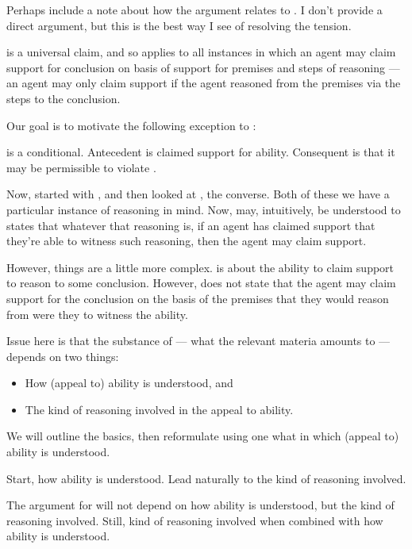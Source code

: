 {
  \color{red}
  Perhaps include a note about how the argument relates to \EAS{}.
  I don't provide a direct argument, but this is the best way I see of resolving the tension.
}

\begin{note}[Alternative]
  \ESU{} is a universal claim, and so applies to all instances in which an agent may claim support for conclusion on basis of support for premises and steps of reasoning --- an agent may only claim support if the agent reasoned from the premises via the steps to the conclusion.

  Our goal is to motivate the following exception to \ESU{}:

  \goalEAS*
\end{note}

\begin{note}
  \EAS{} is a conditional.
  Antecedent is claimed support for ability.
  Consequent is that it may be permissible to violate \ESU{}.
\end{note}

\begin{note}
  Now, started with \USE{}, and then looked at \ESU{}, the converse.
  Both of these we have a particular instance of reasoning in mind.
  Now, \EAS{} may, intuitively, be understood to states that whatever that reasoning is, if an agent has claimed support that they're able to witness such reasoning, then the agent may claim support.

  However, things are a little more complex.
  \EAS{} is about the ability to claim support to reason to some conclusion.
  However, \EAS{} does not state that the agent may claim support for the conclusion on the basis of the premises that they would reason from were they to witness the ability.

  Issue here is that the substance of \EAS{} --- what the relevant materia amounts to --- depends on two things:
  \begin{itemize}
  \item How (appeal to) ability is understood, and
  \item The kind of reasoning involved in the appeal to ability.
  \end{itemize}

  We will outline the basics, then reformulate \EAS{} using one what in which (appeal to) ability is understood.

  Start, how ability is understood.
  Lead naturally to the kind of reasoning involved.

  The argument for \EAS{} will not depend on how ability is understood, but the kind of reasoning involved.
  Still, kind of reasoning involved when combined with how ability is understood.
\end{note}

